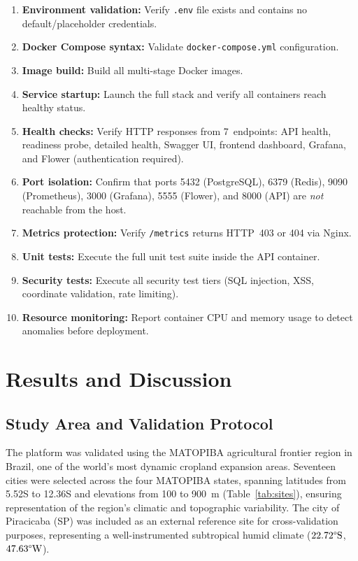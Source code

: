 \documentclass[preprint,review,12pt]{elsarticle}
\begin{document}
\begin{enumerate}
\item \textbf{Environment validation:} Verify \texttt{.env} file
  exists and contains no default/placeholder credentials.
\item \textbf{Docker Compose syntax:} Validate
  \texttt{docker-compose.yml} configuration.
\item \textbf{Image build:} Build all multi-stage Docker images.
\item \textbf{Service startup:} Launch the full stack and verify all
  containers reach healthy status.
\item \textbf{Health checks:} Verify HTTP responses from 7~endpoints:
  API health, readiness probe, detailed health, Swagger UI, frontend
  dashboard, Grafana, and Flower (authentication required).
\item \textbf{Port isolation:} Confirm that ports 5432 (PostgreSQL),
  6379 (Redis), 9090 (Prometheus), 3000 (Grafana), 5555 (Flower),
  and 8000 (API) are \emph{not} reachable from the host.
\item \textbf{Metrics protection:} Verify \texttt{/metrics} returns
  HTTP~403 or 404 via Nginx.
\item \textbf{Unit tests:} Execute the full unit test suite inside
  the API container.
\item \textbf{Security tests:} Execute all security test tiers
  (SQL injection, XSS, coordinate validation, rate limiting).
\item \textbf{Resource monitoring:} Report container CPU and memory
  usage to detect anomalies before deployment.
\end{enumerate}


\section{Results and Discussion}
\label{sec:results_discussion}

\subsection{Study Area and Validation Protocol}
\label{subsec:study_area}

The platform was validated using the MATOPIBA agricultural frontier region in
Brazil, one of the world's most dynamic cropland expansion areas. Seventeen
cities were selected across the four MATOPIBA states, spanning
latitudes from 5.52\textdegree{}S to 12.36\textdegree{}S and elevations from
100 to 900~m (Table~\ref{tab:sites}), ensuring representation of the region's
climatic and topographic variability. The city of Piracicaba (SP) was included
as an external reference site for cross-validation purposes, representing a
well-instrumented subtropical humid climate ($22.72\text{\textdegree{}S}$,
$47.63\text{\textdegree{}W}$).
\end{document}
